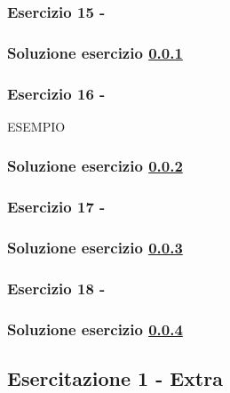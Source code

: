 \documentclass[../main.tex]{subfiles}
\begin{document}
\vspace*{1.5cm}
\subsubsection{Esercizio 15 - }
\label{e2e15}

\subsubsection*{Soluzione esercizio \ref{e2e15}}

\vspace*{1.5cm}
\subsubsection{Esercizio 16 - }
\label{e2e16}

ESEMPIO

\subsubsection*{Soluzione esercizio \ref{e2e16}}

\vspace*{1.5cm}
\subsubsection{Esercizio 17 - }
\label{e2e17}

\subsubsection*{Soluzione esercizio \ref{e2e17}}

\vspace*{1.5cm}
\subsubsection{Esercizio 18 - }
\label{e2e18}

\subsubsection*{Soluzione esercizio \ref{e2e18}}


\vspace*{1.5cm}
\subsection{Esercitazione 1 - Extra}

\vspace*{1.5cm}
\end{document}
